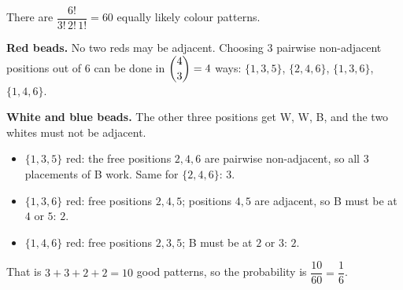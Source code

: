 There are $\dfrac{6!}{3!\,2!\,1!}=60$ equally likely colour patterns.

\textbf{Red beads.} No two reds may be adjacent. Choosing $3$ pairwise non-adjacent positions out of $6$ can be done in $\dbinom43=4$ ways: $\{1,3,5\}$, $\{2,4,6\}$, $\{1,3,6\}$, $\{1,4,6\}$.

\textbf{White and blue beads.} The other three positions get W, W, B, and the two whites must not be adjacent.
\begin{itemize}
\item $\{1,3,5\}$ red: the free positions $2,4,6$ are pairwise non-adjacent, so all $3$ placements of B work. Same for $\{2,4,6\}$: $3$.
\item $\{1,3,6\}$ red: free positions $2,4,5$; positions $4,5$ are adjacent, so B must be at $4$ or $5$: $2$.
\item $\{1,4,6\}$ red: free positions $2,3,5$; B must be at $2$ or $3$: $2$.
\end{itemize}
That is $3+3+2+2=10$ good patterns, so the probability is $\dfrac{10}{60}=\boxed{\dfrac{1}{6}}$.
